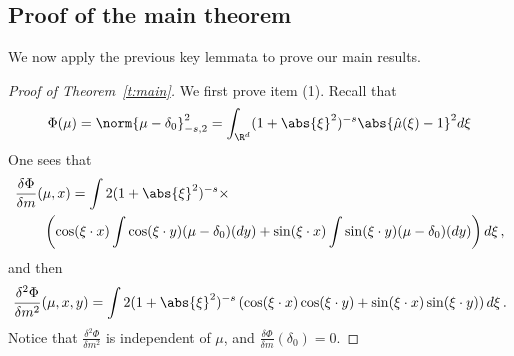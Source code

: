\documentclass{amsart}
\begin{document}
\subsection{Proof of the main theorem}
\label{s:proof-main}

We now apply the previous key lemmata to prove our main results.

\begin{proof}[Proof of Theorem~\ref{t:main}]
\iffalse 
	We first prove item (1). 
	Recall that
	\begin{equation*}
		\Phi(\mu) = \norm{\mu - \delta_0}_{-s,2}^2 = \int_{\R^d} (1 + \abs{\xi}^2)^{-s} \abs{\hat \mu(\xi) - 1}^2 d\xi 
	\end{equation*}
	One sees that
	\begin{align*}
		& \frac{\delta \Phi}{\delta m} (\mu,x) = \int 2(1+\abs{\xi}^2)^{-s} \times \\
		& \qquad \left( \cos(\xi\cdot x) \int \cos(\xi \cdot y) (\mu-\delta_0)(dy) + \sin(\xi \cdot x) \int \sin(\xi \cdot y) (\mu-\delta_0)(dy) \right) d\xi \,,
	\end{align*}
	and then 
	\begin{equation*}
		\frac{\delta^2 \Phi}{\delta m^2} (\mu,x,y) = \int 2(1+\abs{\xi}^2)^{-s} \left( \cos(\xi \cdot x) \cos(\xi \cdot y) + \sin(\xi \cdot x) \sin(\xi \cdot y) \right) d\xi \,.
	\end{equation*}
	Notice that $\frac{\delta^2 \Phi}{\delta m^2}$ is independent of $\mu$, and $\frac{\delta \Phi}{\delta m}(\delta_0) = 0$. 
	

\end{proof}
\end{document}
